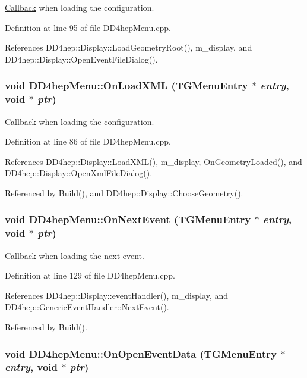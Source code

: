 \hyperlink{class_d_d4hep_1_1_callback}{Callback} when loading the configuration. 

Definition at line 95 of file DD4hepMenu.cpp.

References DD4hep::Display::LoadGeometryRoot(), m\_\-display, and DD4hep::Display::OpenEventFileDialog().\hypertarget{class_d_d4hep_1_1_d_d4hep_menu_a3bb55c2f200a4575cf4bddd720efd5ab}{
\subsubsection[{OnLoadXML}]{\setlength{\rightskip}{0pt plus 5cm}void DD4hepMenu::OnLoadXML (TGMenuEntry $\ast$ {\em entry}, \/  void $\ast$ {\em ptr})}}
\label{class_d_d4hep_1_1_d_d4hep_menu_a3bb55c2f200a4575cf4bddd720efd5ab}


\hyperlink{class_d_d4hep_1_1_callback}{Callback} when loading the configuration. 

Definition at line 86 of file DD4hepMenu.cpp.

References DD4hep::Display::LoadXML(), m\_\-display, OnGeometryLoaded(), and DD4hep::Display::OpenXmlFileDialog().

Referenced by Build(), and DD4hep::Display::ChooseGeometry().\hypertarget{class_d_d4hep_1_1_d_d4hep_menu_aed31811bd4340d374fb002792c17cecd}{
\subsubsection[{OnNextEvent}]{\setlength{\rightskip}{0pt plus 5cm}void DD4hepMenu::OnNextEvent (TGMenuEntry $\ast$ {\em entry}, \/  void $\ast$ {\em ptr})}}
\label{class_d_d4hep_1_1_d_d4hep_menu_aed31811bd4340d374fb002792c17cecd}


\hyperlink{class_d_d4hep_1_1_callback}{Callback} when loading the next event. 

Definition at line 129 of file DD4hepMenu.cpp.

References DD4hep::Display::eventHandler(), m\_\-display, and DD4hep::GenericEventHandler::NextEvent().

Referenced by Build().\hypertarget{class_d_d4hep_1_1_d_d4hep_menu_ac8428b7326df0a54c672ece045fe8d97}{
\subsubsection[{OnOpenEventData}]{\setlength{\rightskip}{0pt plus 5cm}void DD4hepMenu::OnOpenEventData (TGMenuEntry $\ast$ {\em entry}, \/  void $\ast$ {\em ptr})}}
\label{class_d_d4hep_1_1_d_d4hep_menu_ac8428b7326df0a54c672ece045fe8d97}


